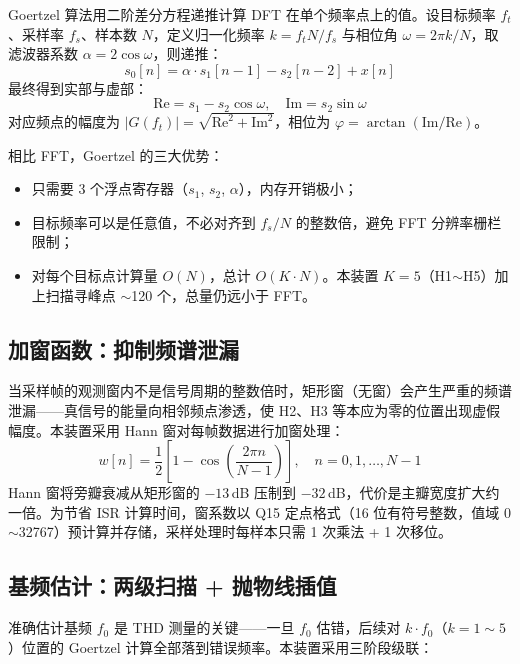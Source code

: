 \documentclass[a4paper]{article}
\begin{document}
	Goertzel 算法用二阶差分方程递推计算 DFT 在单个频率点上的值。设目标频率 $f_t$、采样率 $f_s$、样本数 $N$，定义归一化频率 $k = f_t N / f_s$ 与相位角 $\omega = 2\pi k / N$，取滤波器系数 $\alpha = 2\cos\omega$，则递推：
	\begin{equation}
		s_0[n] = \alpha \cdot s_1[n-1] - s_2[n-2] + x[n]
	\end{equation}
	最终得到实部与虚部：
	\begin{equation}
		\mathrm{Re} = s_1 - s_2 \cos\omega, \quad \mathrm{Im} = s_2 \sin\omega
	\end{equation}
	对应频点的幅度为 $|G(f_t)| = \sqrt{\mathrm{Re}^2 + \mathrm{Im}^2}$，相位为 $\varphi = \arctan(\mathrm{Im}/\mathrm{Re})$。

	相比 FFT，Goertzel 的三大优势：
	\begin{itemize}[leftmargin=2em]
		\item 只需要 3 个浮点寄存器（$s_1$, $s_2$, $\alpha$），内存开销极小；
		\item 目标频率可以是任意值，不必对齐到 $f_s/N$ 的整数倍，避免 FFT 分辨率栅栏限制；
		\item 对每个目标点计算量 $O(N)$，总计 $O(K \cdot N)$。本装置 $K = 5$（H1$\sim$H5）加上扫描寻峰点 $\sim$120 个，总量仍远小于 FFT。
	\end{itemize}

	\subsection{加窗函数：抑制频谱泄漏}

	当采样帧的观测窗内不是信号周期的整数倍时，矩形窗（无窗）会产生严重的频谱泄漏——真信号的能量向相邻频点渗透，使 H2、H3 等本应为零的位置出现虚假幅度。本装置采用 Hann 窗对每帧数据进行加窗处理：
	\begin{equation}
		w[n] = \frac{1}{2}\left[1 - \cos\left(\frac{2\pi n}{N-1}\right)\right], \quad n = 0, 1, \ldots, N-1
	\end{equation}
	Hann 窗将旁瓣衰减从矩形窗的 $-13$\,dB 压制到 $-32$\,dB，代价是主瓣宽度扩大约一倍。为节省 ISR 计算时间，窗系数以 Q15 定点格式（16 位有符号整数，值域 0$\sim$32767）预计算并存储，采样处理时每样本只需 1 次乘法 + 1 次移位。

	\subsection{基频估计：两级扫描 + 抛物线插值}

	准确估计基频 $f_0$ 是 THD 测量的关键——一旦 $f_0$ 估错，后续对 $k \cdot f_0$（$k = 1 \sim 5$）位置的 Goertzel 计算全部落到错误频率。本装置采用三阶段级联：
\end{document}
